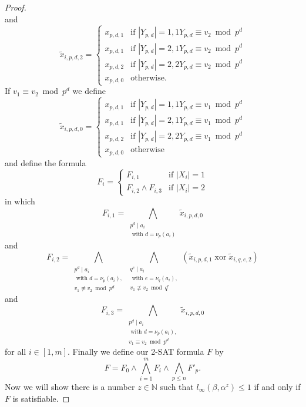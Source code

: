 \documentclass{article}
\DeclareMathOperator{\xor}{xor}
\begin{document}
\begin{proof}
\begin{displaymath}
\end{displaymath}
and
\begin{displaymath}
\tilde{x}_{i,p,d,2} = \begin{cases}
x_{p,d,1} & \text{if } |Y_{p,d}|=1,1Y_{p,d} \equiv v_2 \bmod p^d\\
x_{p,d,1} & \text{if } |Y_{p,d}|=2,1Y_{p,d} \equiv v_2 \bmod p^d\\
x_{p,d,2} & \text{if } |Y_{p,d}|=2,2Y_{p,d} \equiv v_2 \bmod p^d\\
x_{p,d,0} & \text{otherwise}.
\end{cases}
\end{displaymath}
If $v_1 \equiv v_2 \bmod p^d$ we define
\begin{displaymath}
\tilde{x}_{i,p,d,0} = \begin{cases}
x_{p,d,1} & \text{if } |Y_{p,d}|=1,1Y_{p,d} \equiv v_1 \bmod p^d\\
x_{p,d,1} & \text{if } |Y_{p,d}|=2,1Y_{p,d} \equiv v_1 \bmod p^d\\
x_{p,d,2} & \text{if } |Y_{p,d}|=2,2Y_{p,d} \equiv v_1 \bmod p^d\\
x_{p,d,0} & \text{otherwise}
\end{cases}
\end{displaymath}
and define the formula
\begin{displaymath}
F_i = \begin{cases}
F_{i,1} & \text{if } |X_i|=1\\
F_{i,2} \land F_{i,3} & \text{if } |X_i|=2
\end{cases}
\end{displaymath}
in which
\begin{displaymath}
F_{i,1} = \bigwedge_{\substack{p^d \mid a_i\\\text{ with } d = \nu_p(a_i)}} \tilde{x}_{i,p,d,0}
\end{displaymath}
and
\begin{displaymath}
F_{i,2} = \bigwedge_{\substack{p^d \mid a_i\\\text{ with } d = \nu_p(a_i),\\v_1 \not \equiv v_2 \bmod p^d}} \bigwedge_{\substack{q^e \mid a_i\\\text{ with } e = \nu_q(a_i),\\v_1 \not \equiv v_2 \bmod q^e}} (\tilde{x}_{i,p,d,1} \xor \tilde{x}_{i,q,e,2})
\end{displaymath}
and
\begin{displaymath}
F_{i,3} = \bigwedge_{\substack{p^d \mid a_i\\\text{ with } d = \nu_p(a_i),\\v_1 \equiv v_2 \bmod p^d}} \tilde{x}_{i,p,d,0}
\end{displaymath}
for all $i \in [1,m]$. Finally we define our \textsc{2-SAT} formula $F$ by
\begin{displaymath}
F = F_0 \land \bigwedge_{i=1}^m F_i \land \bigwedge_{p \leq n} F'_p.
\end{displaymath}
Now we will show there is a number $z \in \mathbb{N}$ such that $l_\infty(\beta, \alpha^z) \leq 1$ if and only if $F$ is satisfiable.


\end{proof}
\end{document}
